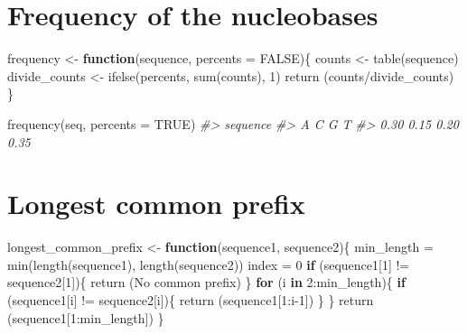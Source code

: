 \documentclass[
]{book}
\newenvironment{Shaded}{\begin{snugshade}}{\end{snugshade}}
\newcommand{\AttributeTok}[1]{\textcolor[rgb]{0.77,0.63,0.00}{#1}}
\newcommand{\CommentTok}[1]{\textcolor[rgb]{0.56,0.35,0.01}{\textit{#1}}}
\newcommand{\ConstantTok}[1]{\textcolor[rgb]{0.00,0.00,0.00}{#1}}
\newcommand{\ControlFlowTok}[1]{\textcolor[rgb]{0.13,0.29,0.53}{\textbf{#1}}}
\newcommand{\DecValTok}[1]{\textcolor[rgb]{0.00,0.00,0.81}{#1}}
\newcommand{\FunctionTok}[1]{\textcolor[rgb]{0.00,0.00,0.00}{#1}}
\newcommand{\NormalTok}[1]{#1}
\newcommand{\OtherTok}[1]{\textcolor[rgb]{0.56,0.35,0.01}{#1}}
\newcommand{\SpecialCharTok}[1]{\textcolor[rgb]{0.00,0.00,0.00}{#1}}
\newcommand{\StringTok}[1]{\textcolor[rgb]{0.31,0.60,0.02}{#1}}
\begin{document}
\hypertarget{frequency-of-the-nucleobases}{%
\section{Frequency of the nucleobases}\label{frequency-of-the-nucleobases}}

\begin{Shaded}
\begin{Highlighting}[]
\NormalTok{frequency }\OtherTok{\textless{}{-}} \ControlFlowTok{function}\NormalTok{(sequence, }\AttributeTok{percents =} \ConstantTok{FALSE}\NormalTok{)\{}
\NormalTok{  counts }\OtherTok{\textless{}{-}} \FunctionTok{table}\NormalTok{(sequence)}
\NormalTok{  divide\_counts }\OtherTok{\textless{}{-}} \FunctionTok{ifelse}\NormalTok{(percents, }\FunctionTok{sum}\NormalTok{(counts), }\DecValTok{1}\NormalTok{)}
  \FunctionTok{return}\NormalTok{ (counts}\SpecialCharTok{/}\NormalTok{divide\_counts)}
\NormalTok{\}}
\end{Highlighting}
\end{Shaded}

\begin{Shaded}
\begin{Highlighting}[]
\FunctionTok{frequency}\NormalTok{(seq, }\AttributeTok{percents =} \ConstantTok{TRUE}\NormalTok{)}
\CommentTok{\#\textgreater{} sequence}
\CommentTok{\#\textgreater{}    A    C    G    T }
\CommentTok{\#\textgreater{} 0.30 0.15 0.20 0.35}
\end{Highlighting}
\end{Shaded}

\hypertarget{longest-common-prefix}{%
\section{Longest common prefix}\label{longest-common-prefix}}

\begin{Shaded}
\begin{Highlighting}[]
\NormalTok{longest\_common\_prefix }\OtherTok{\textless{}{-}} \ControlFlowTok{function}\NormalTok{(sequence1, sequence2)\{}
\NormalTok{  min\_length }\OtherTok{=} \FunctionTok{min}\NormalTok{(}\FunctionTok{length}\NormalTok{(sequence1), }\FunctionTok{length}\NormalTok{(sequence2))}
\NormalTok{  index }\OtherTok{=} \DecValTok{0}
  \ControlFlowTok{if}\NormalTok{ (sequence1[}\DecValTok{1}\NormalTok{] }\SpecialCharTok{!=}\NormalTok{ sequence2[}\DecValTok{1}\NormalTok{])\{}
    \FunctionTok{return}\NormalTok{ (}\StringTok{\textquotesingle{}No common prefix\textquotesingle{}}\NormalTok{)}
\NormalTok{  \}}
  \ControlFlowTok{for}\NormalTok{ (i }\ControlFlowTok{in} \DecValTok{2}\SpecialCharTok{:}\NormalTok{min\_length)\{}
    \ControlFlowTok{if}\NormalTok{ (sequence1[i] }\SpecialCharTok{!=}\NormalTok{ sequence2[i])\{}
      \FunctionTok{return}\NormalTok{ (sequence1[}\DecValTok{1}\SpecialCharTok{:}\NormalTok{i}\DecValTok{{-}1}\NormalTok{])}
\NormalTok{    \}}
\NormalTok{  \}}
  \FunctionTok{return}\NormalTok{ (sequence1[}\DecValTok{1}\SpecialCharTok{:}\NormalTok{min\_length])}
\NormalTok{\}}
\end{Highlighting}
\end{Shaded}
\end{document}
